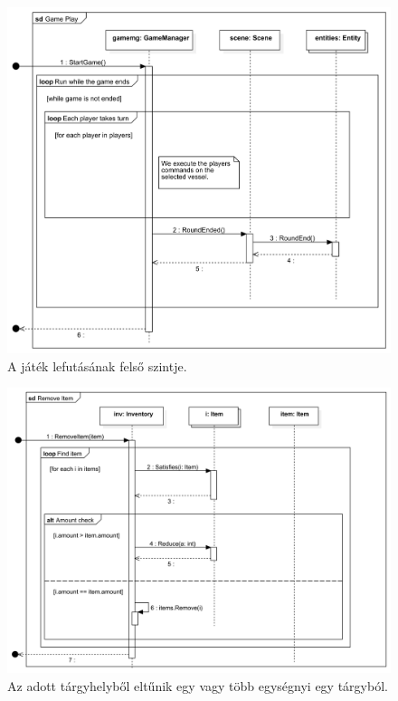 \begin{figure}[H] 
\centering 
\includegraphics[width=1\textwidth]{docs/3_Project/svg/Design Model!Game play!Game Play!Game Play_27.png} 
\caption{A játék lefutásának felső szintje.} 
\end{figure} 

\begin{figure}[H] 
\centering 
\includegraphics[width=1\textwidth]{docs/3_Project/svg/Design Model!Inventory!Remove Item!Remove Item_28.png} 
\caption{Az adott tárgyhelyből eltűnik egy vagy több egységnyi egy tárgyból.} 
\end{figure} 

